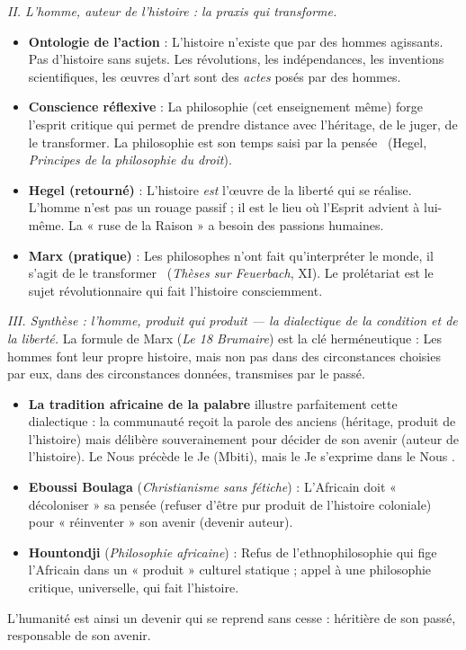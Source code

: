 \documentclass[11pt]{article}
\newcommand{\cle}[1]{{\popxbold\color{popdark}#1}}
\begin{document}
\begin{exoresolu}
\emph{II. L'homme, auteur de l'histoire : la praxis qui transforme.}
\begin{itemize}
\item \textbf{Ontologie de l'action} : L'histoire n'existe que par des hommes agissants. Pas d'histoire sans sujets. Les révolutions, les indépendances, les inventions scientifiques, les œuvres d'art sont des \emph{actes} posés par des hommes.
\item \textbf{Conscience réflexive} : La philosophie (cet enseignement même) forge l'esprit critique qui permet de prendre distance avec l'héritage, de le juger, de le transformer. \guillemotleft La philosophie est son temps saisi par la pensée \guillemotright\ (Hegel, \emph{Principes de la philosophie du droit}).
\item \textbf{Hegel (retourné)} : L'histoire \emph{est} l'œuvre de la liberté qui se réalise. L'homme n'est pas un rouage passif ; il est le lieu où l'Esprit advient à lui-même. La « ruse de la Raison » a besoin des passions humaines.
\item \textbf{Marx (pratique)} : \guillemotleft Les philosophes n'ont fait qu'interpréter le monde, il s'agit de le transformer \guillemotright\ (\emph{Thèses sur Feuerbach}, XI). Le prolétariat est le sujet révolutionnaire qui fait l'histoire consciemment.
\end{itemize}

\emph{III. Synthèse : l'homme, produit qui produit — la dialectique de la condition et de la liberté.}
La formule de Marx (\emph{Le 18 Brumaire}) est la clé herméneutique : \guillemotleft Les hommes font leur propre histoire, mais non pas dans des circonstances choisies par eux, dans des circonstances données, transmises par le passé. \guillemotright
\begin{itemize}
\item \textbf{La tradition africaine de la palabre} illustre parfaitement cette dialectique : la communauté reçoit la parole des anciens (héritage, produit de l'histoire) mais délibère souverainement pour décider de son avenir (auteur de l'histoire). Le \guillemotleft Nous \guillemotright précède le \guillemotleft Je \guillemotright (Mbiti), mais le \guillemotleft Je \guillemotright s'exprime dans le \guillemotleft Nous \guillemotright.
\item \textbf{Eboussi Boulaga} (\emph{Christianisme sans fétiche}) : L'Africain doit « décoloniser » sa pensée (refuser d'être pur produit de l'histoire coloniale) pour « réinventer » son avenir (devenir auteur).
\item \textbf{Hountondji} (\emph{Philosophie africaine}) : Refus de l'ethnophilosophie qui fige l'Africain dans un « produit » culturel statique ; appel à une philosophie critique, universelle, qui fait l'histoire.
\end{itemize}
L'humanité est ainsi un \cle{devenir} qui se reprend sans cesse : héritière de son passé, responsable de son avenir.


\end{exoresolu}
\end{document}
